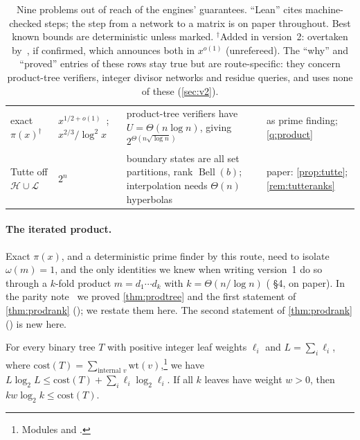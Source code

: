 \documentclass[10pt]{amsart}
\theoremstyle{plain}
\theoremstyle{definition}
\theoremstyle{remark}
\numberwithin{equation}{section}
\newcommand{\Bell}{\operatorname{Bell}}
\begin{document}
\begin{table}[ht]
\begin{tabular}{@{}>{\raggedright}p{}>{\raggedright}p{}>{\raggedright}p{}>{\raggedright\arraybackslash}p{}@{}}
exact $\pi(x)^{\dagger}$ & $x^{1/2+o(1)}$~\cite{LO87}; $x^{2/3}/\log^2x$~\cite{DR96} & product-tree verifiers have $U=\Theta(n\log n)$, giving $2^{\Theta(n\sqrt{\log n})}$ & as prime finding; \cref{q:product}\\
Tutte off $\mathcal H\cup\mathcal L$ & $2^n$~\cite{BHKK08Tutte} & boundary states are all set partitions, rank $\Bell(b)$; interpolation needs $\Theta(n)$ hyperbolas & paper: \cref{prop:tutte}; \cref{rem:tutteranks}\\
\bottomrule
\end{tabular}
\caption{Nine problems out of reach of the engines' guarantees. ``Lean'' cites machine-checked steps;
the step from a network to a matrix is on paper throughout. Best known bounds are deterministic
unless marked. $^{\dagger}$Added in version~2: overtaken by~\cite{Ni26}, if confirmed, which announces
both in $x^{o(1)}$ (unrefereed). The ``why'' and ``proved'' entries of these rows stay true but are
route-specific: they concern product-tree verifiers, integer divisor networks and residue queries, and
\cite{Ni26} uses none of these (\cref{sec:v2}).}\label{tab:map}
\end{table}

\paragraph{The iterated product.} Exact $\pi(x)$, and a deterministic prime finder by this route, need
to isolate $\omega(m)=1$, and the only identities we knew when writing version~1 do so through a $k$-fold product
$m=d_1\cdots d_k$ with $k=\Theta(n/\log n)$ ( \S4, on paper). In the parity
note~\cite{TulPar26} we proved \cref{thm:prodtree} and the first statement of \cref{thm:prodrank}
(); we restate them here. The second statement of \cref{thm:prodrank}
() is new here.

\begin{theorem}\label{thm:prodtree}
For every binary tree $T$ with positive integer leaf weights $\ell_i$ and $L=\sum_i\ell_i$, where
$\mathrm{cost}(T)=\sum_{\text{internal }v}\mathrm{wt}(v)$,\footnote{Modules
 and .} we have
$L\log_2L\le\mathrm{cost}(T)+\sum_i\ell_i\log_2\ell_i$. If all $k$ leaves have weight $w>0$, then
$kw\log_2k\le\mathrm{cost}(T)$.
\end{theorem}
\end{document}
